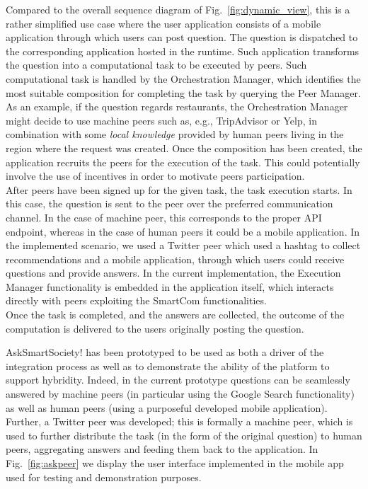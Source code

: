 Compared to the overall sequence diagram of Fig.~\ref{fig:dynamic_view}, this is a rather simplified use case where the user application consists of a mobile application through which users can post question. The question is dispatched to the corresponding application hosted in the runtime. Such application transforms the question into a computational task to be executed by peers. Such computational task is handled by the Orchestration Manager, which identifies the most suitable composition for completing the task by querying the Peer Manager. As an example, if the question regards restaurants, the Orchestration Manager might decide to use machine peers such as, e.g., TripAdvisor or Yelp, in combination with some \textit{local knowledge} provided by human peers living in the region where the request was created. Once the composition has been created, the application recruits the peers for the execution of the task. This could potentially involve the use of incentives in order to motivate peers participation.\\
After peers have been signed up for the given task, the task execution starts. In this case, the question is sent to the peer over the preferred communication channel. In the case of machine peer, this corresponds to the proper API endpoint, whereas in the case of human peers it could be a mobile application. In the implemented scenario, we used a Twitter peer which used a hashtag to collect recommendations and a mobile application, through which users could receive questions and provide answers. In the current implementation, the Execution Manager functionality is embedded in the application itself, which interacts directly with peers exploiting the SmartCom functionalities.\\
Once the task is completed, and the answers are collected, the outcome of the computation is delivered to the users originally posting the question.

AskSmartSociety! has been prototyped to be used as both a driver of the integration process as well as to demonstrate the ability of the platform to support hybridity. Indeed, in the current prototype questions can be seamlessly answered by machine peers (in particular using the Google Search functionality) as well as human peers (using a purposeful developed mobile application). Further, a Twitter peer was developed; this is formally a machine peer, which is used to further distribute the task (in the form of the original question) to human peers, aggregating answers and feeding them back to the application. In Fig.~\ref{fig:askpeer} we display the user interface implemented in the mobile app used for testing and demonstration purposes. 


